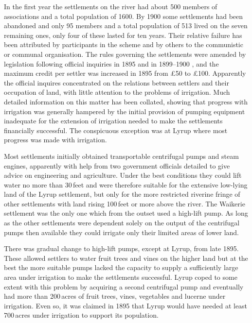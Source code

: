 In the first year the settlements on the river had about 500 members
of associations and a total population of 1600.  By 1900 some
settlements had been abandoned and only 95 members and a total
population of 513 lived on the seven remaining ones, only four of
these lasted for ten years.  Their relative failure has been
attributed by participants in the scheme and by others to the
communistic or communal organisation.  The rules governing the
settlements were amended by legislation following official inquiries
in 1895 and in 1899--1900 , and the maximum credit per settler was
increased in 1895 from \pounds50 to \pounds100.  Apparently the
official inquires concentrated on the relations between settlers and
their occupation of land, with little attention to the problems of
irrigation.  Much detailed information on this matter has been
collated, showing that progress with irrigation was generally hampered
by the initial provision of pumping equipment inadequate for the
extension of irrigation needed to make the settlements financially
successful.  The conspicuous exception was at Lyrup where most
progress was made with irrigation.

Most settlements initially obtained transportable centrifugal pumps
 and steam engines, apparently with help from
two government officials detailed to give advice on engineering and
agriculture.  Under the best conditions they could lift water no more
than 30\,feet and were therefore suitable for the extensive low-lying
land of the Lyrup settlement, but only for the more
restricted riverine fringe of other settlements with land rising
100\,feet or more above the river.  The Waikerie 
settlement was the only one which from the outset used a high-lift
pump.  As long as the other settlements were
dependent solely on the output of the centrifugal pumps then available
they could irrigate only their limited areas of lower land.

There was gradual change to high-lift pumps, except at Lyrup, from
late 1895.  These allowed settlers to water fruit trees and vines on
the higher land but at the best the more suitable pumps lacked the
capacity to supply a sufficiently large area under irrigation to make
the settlements successful.  Lyrup coped to some extent with this
problem by acquiring a second centrifugal pump
 and eventually had more
than 200\,acres of fruit trees, vines, vegetables and lucerne under
irrigation.  Even so, it was claimed in 1895 that Lyrup would have
needed at least 700\,acres under irrigation to support its
population.

